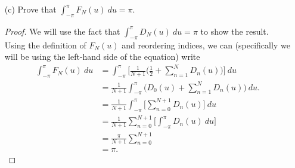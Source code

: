 \begin{enumerate}
\begin{proof}[Solution]
        \[  \Big| \frac{ 1 }{ 2(N+1) }  \Big| < \varepsilon.  \] Furthermore, the sine function is bounded by \(  1  \). Hence, we can write the following
        \begin{align*}
            \Big| \frac{ 1 }{ 2(N+1) } \Big[ \frac{ \sin((N+1)\frac{ u }{ 2 } ) }{ \sin(u/2) } \Big]^{2} \Big| &\leq \Big| \frac{ 1 }{ 2(N+1) }  \Big| \cdot \Big| \frac{ \sin((N+1) \frac{ u }{ 2 } ) }{ \sin(u/2)  }  \Big|^{2}  \\ 
                                                                                                               &\leq \frac{ 1 }{ 2(N+1) } \\
                                                                                                               &< \varepsilon.
        \end{align*}
        Hence, we must also have 
        \[  \frac{ 1 }{ 2(N+1)  } \Big[\frac{ \sin((N+1)\frac{ u }{ 2 } ) }{ \sin(u/2) } \Big]^{2} \to 0  \] uniformly.
        \end{proof}
    \item[(c)] Prove that \( \int_{ -\pi  }^{ \pi  } F_{N}(u)  \ du = \pi. \)
        \begin{proof}
        We will use the fact that \( \int_{ -\pi }^{ \pi } D_{N}(u)  \ du = \pi \) to show the result. Using the definition of \( F_{N}(u)  \) and reordering indices, we can (specifically we will be using the left-hand side of the equation) write 
        \begin{align*}
            \int_{ -\pi  }^{ \pi  } F_{N}(u)   \ du &= \int_{ -\pi  }^{ \pi  } \Big[ \frac{ 1 }{ N+1 } \Big( \frac{ 1 }{ 2 } + \sum_{ n=1 }^{ N } D_{n}(u) \Big) \Big]   \ du \\
                                                    &= \frac{ 1 }{ N+1 } \int_{ -\pi  }^{ \pi  }  \Big( D_{0}(u) + \sum_{ n=1 }^{ N } D_{n}(u) \Big) \ du. \\
                                                    &= \frac{ 1 }{ N+1 }  \int_{ -\pi  }^{ \pi  } \Big[ \sum_{ n=0 }^{ N+1 } D_{n}(u) \Big] \ du \\
                                                    &= \frac{ 1 }{ N+1 } \sum_{ n=0}^{ N+1 } \Big[ \int_{ -\pi }^{ \pi } D_{n}(u)  \ du \Big] \\
                                                    &= \frac{ \pi }{ N+1 } \sum_{ n=0 }^{ N+1 } \\
                                                    &=  \pi.
        \end{align*}

\end{proof}
\end{enumerate}
